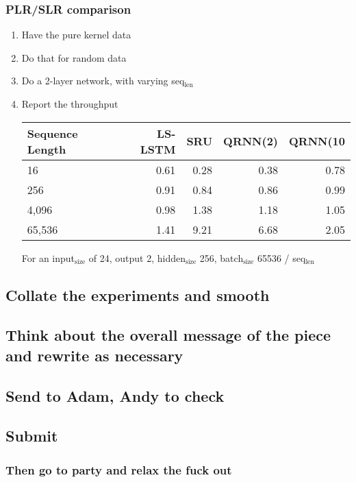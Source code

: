 \documentclass[11pt]{article}
\begin{document}
\subsubsection{PLR/SLR comparison}
\label{sec-1-3-4}
\begin{enumerate}
\item Have the pure kernel data
\label{sec-1-3-4-1}

\item Do that for random data
\label{sec-1-3-4-2}
\item Do a 2-layer network, with varying seq$_{\text{len}}$
\label{sec-1-3-4-3}
\item Report the throughput
\label{sec-1-3-4-4}

\begin{center}
\begin{tabular}{lrrrr}
Sequence Length & LS-LSTM & SRU & QRNN(2) & QRNN(10\\
\hline
16 & 0.61 & 0.28 & 0.38 & 0.78\\
256 & 0.91 & 0.84 & 0.86 & 0.99\\
4,096 & 0.98 & 1.38 & 1.18 & 1.05\\
65,536 & 1.41 & 9.21 & 6.68 & 2.05\\
\end{tabular}
\end{center}
For an input$_{\text{size}}$ of 24, output 2, hidden$_{\text{size}}$ 256, 
batch$_{\text{size}}$ 65536 / seq$_{\text{len}}$
\end{enumerate}

\subsection{Collate the experiments and smooth}
\label{sec-1-4}
\subsection{Think about the overall message of the piece and rewrite as necessary}
\label{sec-1-5}
\subsection{Send to Adam, Andy to check}
\label{sec-1-6}
\subsection{Submit}
\label{sec-1-7}
\subsubsection{Then go to party and relax the fuck out}
\label{sec-1-7-1}
\end{document}
